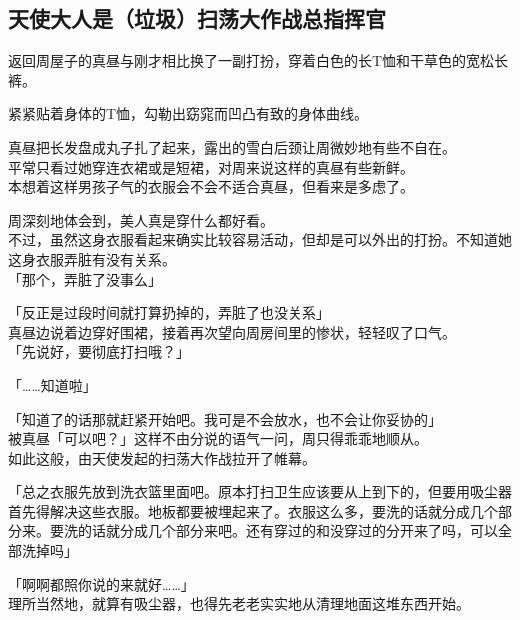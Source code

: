 \subsection{天使大人是（垃圾）扫荡大作战总指挥官}

返回周屋子的真昼与刚才相比换了一副打扮，穿着白色的长T恤和干草色的宽松长裤。

紧紧贴着身体的T恤，勾勒出窈窕而凹凸有致的身体曲线。

真昼把长发盘成丸子扎了起来，露出的雪白后颈让周微妙地有些不自在。\\

平常只看过她穿连衣裙或是短裙，对周来说这样的真昼有些新鲜。\\

本想着这样男孩子气的衣服会不会不适合真昼，但看来是多虑了。

周深刻地体会到，美人真是穿什么都好看。\\

不过，虽然这身衣服看起来确实比较容易活动，但却是可以外出的打扮。不知道她这身衣服弄脏有没有关系。\\

「那个，弄脏了没事么」

「反正是过段时间就打算扔掉的，弄脏了也没关系」\\

真昼边说着边穿好围裙，接着再次望向周房间里的惨状，轻轻叹了口气。\\

「先说好，要彻底打扫哦？」

「……知道啦」

「知道了的话那就赶紧开始吧。我可是不会放水，也不会让你妥协的」\\

被真昼「可以吧？」这样不由分说的语气一问，周只得乖乖地顺从。\\

如此这般，由天使发起的扫荡大作战拉开了帷幕。\\

\vspace{2\baselineskip}

「总之衣服先放到洗衣篮里面吧。原本打扫卫生应该要从上到下的，但要用吸尘器首先得解决这些衣服。地板都要被埋起来了。衣服这么多，要洗的话就分成几个部分来。要洗的话就分成几个部分来吧。还有穿过的和没穿过的分开来了吗，可以全部洗掉吗」

「啊啊都照你说的来就好……」\\

理所当然地，就算有吸尘器，也得先老老实实地从清理地面这堆东西开始。\\

